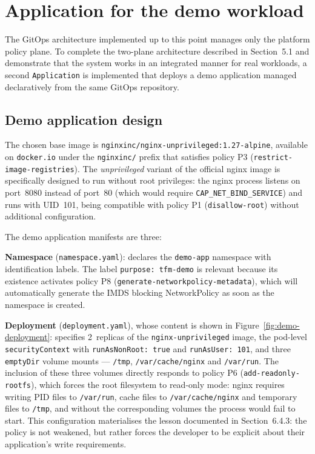 \section{Application for the demo workload}

The GitOps architecture implemented up to this point manages only the platform policy plane. To complete the two-plane architecture described in Section~5.1 and demonstrate that the system works in an integrated manner for real workloads, a second \texttt{Application} is implemented that deploys a demo application managed declaratively from the same GitOps repository.

\subsection{Demo application design}

The chosen base image is \texttt{nginxinc/nginx-unprivileged:1.27-alpine}, available on \texttt{docker.io} under the \texttt{nginxinc/} prefix that satisfies policy P3 (\texttt{restrict-image-regist\-ries}). The \textit{unprivileged} variant of the official nginx image is specifically designed to run without root privileges: the nginx process listens on port~8080 instead of port~80 (which would require \texttt{CAP\_NET\_BIND\_SERVICE}) and runs with UID~101, being compatible with policy P1 (\texttt{disallow-root}) without additional configuration.

The demo application manifests are three:

\textbf{Namespace} (\texttt{namespace.yaml}): declares the \texttt{demo-app} namespace with identification labels. The label \texttt{purpose:\,tfm-demo} is relevant because its existence activates policy P8 (\texttt{generate-networkpolicy-metadata}), which will automatically generate the IMDS blocking NetworkPolicy as soon as the namespace is created.

\textbf{Deployment} (\texttt{deployment.yaml}), whose content is shown in Figure~\ref{fig:demo-deployment}: specifies 2~replicas of the \texttt{nginx-unprivileged} image, the pod-level \texttt{securityContext} with \texttt{runAsNonRoot:\,true} and \texttt{runAsUser:\,101}, and three \texttt{emptyDir} volume mounts --- \texttt{/tmp}, \texttt{/var/cache/nginx} and \texttt{/var/run}. The inclusion of these three volumes directly responds to policy P6 (\texttt{add-readonly-rootfs}), which forces the root filesystem to read-only mode: nginx requires writing PID files to \texttt{/var/run}, cache files to \texttt{/var/cache/nginx} and temporary files to \texttt{/tmp}, and without the corresponding volumes the process would fail to start. This configuration materialises the lesson documented in Section~6.4.3: the policy is not weakened, but rather forces the developer to be explicit about their application's write requirements.

